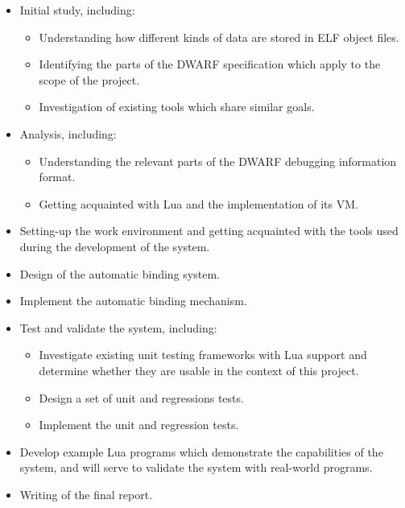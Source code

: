 \begin{itemize}
	\item Initial study, including:
		\begin{itemize}
			\item Understanding how different kinds of data are stored in \gls{ELF}
				object files.
			\item Identifying the parts of the \gls{DWARF} specification which apply
				to the scope of the project.
			\item Investigation of existing tools which share similar goals.
		\end{itemize}

	\item Analysis, including:
		\begin{itemize}
			\item Understanding the relevant parts of the \gls{DWARF}
				debugging information format.
			\item Getting acquainted with Lua and the implementation
				of its \gls{VM}.
		\end{itemize}

	\item Setting-up the work environment and getting acquainted with the tools
		used during the development of the system.

	\item Design of the automatic binding system.

	\item Implement the automatic binding mechanism.

	\item Test and validate the system, including:
		\begin{itemize}
			\item Investigate existing unit testing frameworks with Lua support and
				determine whether they are usable in the context of this project.
			\item Design a set of unit and regressions tests.
			\item Implement the unit and regression tests.
		\end{itemize}

	\item Develop example Lua programs which demonstrate the capabilities of
		the system, and will serve to validate the system with real-world
		programs.

	\item Writing of the final report.
\end{itemize}



